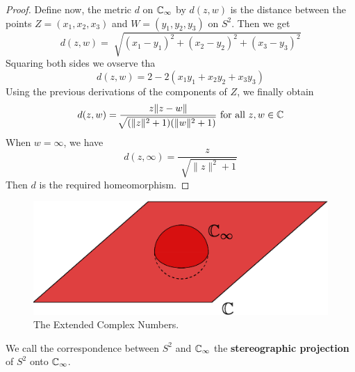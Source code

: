 \begin{proof}
    Define now, the metric $d$ on  $\mathbb{C}_\infty$ by  $d(z,w)$ is the distance
    between the points $Z=(x_1,x_2,x_3)$ and $W=(y_1,y_2,y_3)$ on $S^2$. Then we
    get
    \begin{equation*}
        d(z,w)=\sqrt[]{(x_1-y_1)^2+(x_2-y_2)^2+(x_3-y_3)^2}
    \end{equation*}
    Squaring both sides we ovserve tha
    \begin{equation*}
        d(z,w)=2-2(x_1y_1+x_2y_2+x_3y_3)
    \end{equation*}
    Using the previous derivations of the components of $Z$, we finally obtain
    \begin{equation*}
        d(z,w)=\frac{z\|z-w\|}{\sqrt[]{(\|z\|^2+1)(\|w\|^2+1)}} \text{ for all }
        z,w \in \mathbb{C}
    \end{equation*}
    When $w=\infty$, we have
    \begin{equation*}
        d(z,\infty)=\frac{z}{\sqrt[]{\|z\|^2+1}}
    \end{equation*}
    Then $d$ is the required homeomorphism.
\end{proof}

\begin{figure}[h]
    \centering
    \includegraphics[scale=0.5]{Figures/Chapter1/extended_complex_numbers.eps}
    \caption{The Extended Complex Numbers.}
    \label{fig_1.2}
\end{figure}

\begin{definition}
    We call the correspondence between $S^2$ and  $\mathbb{C}_\infty$ the
    \textbf{stereographic projection} of $S^2$ onto $\mathbb{C}_\infty$.
\end{definition}
